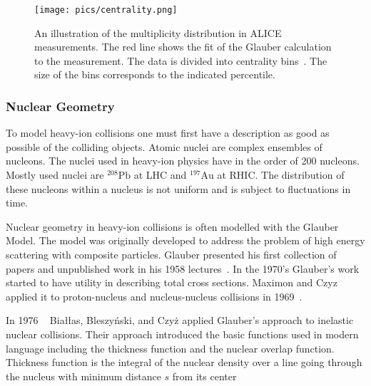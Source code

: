 \begin{figure}[htb]
\centering

               \texttt{[image: pics/centrality.png]}
        \caption[An illustration of the multiplicity distribution in ALICE measurement with centrality classes.]{An illustration of the multiplicity distribution in ALICE measurements. The red line shows
the fit of the Glauber calculation to the measurement. The data is divided into centrality bins~\cite{PhysRevC.88.044909}. The size of the bins corresponds to the indicated percentile.}
        	\label{fig:centrality}
\end{figure}



\subsubsection{Nuclear Geometry}
\label{sec:glauber}
To model heavy-ion collisions one must first have a description as good as possible of the colliding objects. Atomic nuclei are complex ensembles of nucleons. The nuclei used in heavy-ion physics have in the order of 200 nucleons. Mostly used nuclei are $\mathrm{^{208}Pb}$ at LHC and $\mathrm{^{197}Au}$ at RHIC. The distribution of these nucleons within a nucleus is not uniform and is subject to fluctuations in time.

Nuclear geometry in heavy-ion collisions is often modelled with the Glauber Model. The model was originally developed to address the problem of high energy scattering with composite particles. Glauber presented his first collection of papers and unpublished work in his 1958 lectures~\cite{Glauber:1959}. In the 1970's Glauber's work started to have utility in describing total cross sections. Maximon and Czyz applied it to proton-nucleus and nucleus-nucleus collisions in 1969~\cite{Czyz:1969}. 

In 1976 ~\cite{Biallas1976461} Białłas, Bleszyński, and Czyż applied Glauber's approach to inelastic nuclear collisions. Their approach introduced the basic functions used in modern language including the thickness function and the nuclear overlap function. Thickness function is the integral of the nuclear density over a line going through the nucleus with minimum distance $s$ from its center

